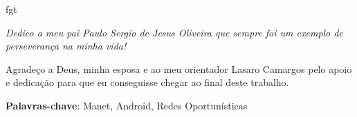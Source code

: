 fgt\documentclass[12pt, %
openright, 
oneside, %
a4paper,    %
brazil]{facom-ufu-abntex2}
\begin{document}
\begin{dedicatoria}
   \vspace*{\fill}
   \centering
   \noindent
   \textit{Dedico a meu pai Paulo Sergio de Jesus Oliveira que sempre foi um exemplo de perseverança na minha vida!}  %
   \vspace*{\fill}
\end{dedicatoria}

\begin{agradecimentos}
Agradeço a Deus, minha esposa e ao meu orientador Lasaro Camargos pelo apoio e dedicação para que eu conseguisse chegar ao final deste trabalho. %
\end{agradecimentos}




\begin{resumo} %

 \vspace{\onelineskip}
    
 \noindent
 \textbf{Palavras-chave}: Manet, Android, Redes Oportunísticas%
\end{resumo}

\listoffigures*
\cleardoublepage

\listoftables*
\cleardoublepage




\end{document}
